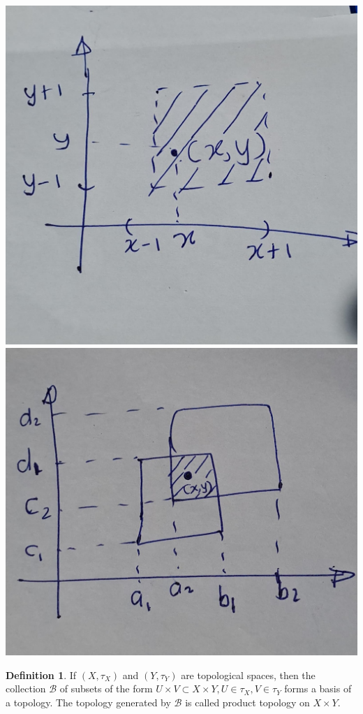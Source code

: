 \documentclass[
]{book}
\theoremstyle{definition}
\newtheorem{definition}{Definition}[chapter]
\theoremstyle{definition}
\theoremstyle{definition}
\theoremstyle{definition}
\theoremstyle{remark}
\begin{document}
\includegraphics{figures/figure 04.jpg}
\includegraphics{figures/figure 05.jpg}

\begin{definition}
\protect\hypertarget{def:unnamed-chunk-21}{}\label{def:unnamed-chunk-21}If \(\left(X, \tau_{X}\right)\) and \(\left(Y, \tau_{Y}\right)\) are topological spaces, then the collection \(\mathcal{B}\) of subsets of the form \(U \times V \subset X \times Y, U \in \tau_{X}, V \in \tau_{Y}\) forms a basis of a topology. The topology generated by \(\mathcal{B}\) is called product topology on \(X \times Y\).
\end{definition}
\end{document}
